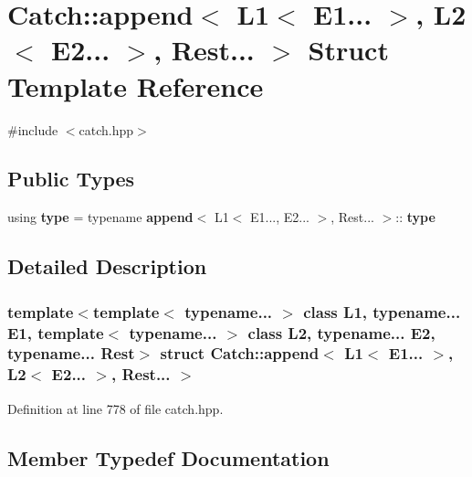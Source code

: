\section{Catch\+::append$<$ L1$<$ E1... $>$, L2$<$ E2... $>$, Rest... $>$ Struct Template Reference}
\label{struct_catch_1_1append_3_01_l1_3_01_e1_8_8_8_01_4_00_01_l2_3_01_e2_8_8_8_01_4_00_01_rest_8_8_8_01_4}


{\ttfamily \#include $<$catch.\+hpp$>$}

\subsection*{Public Types}
\begin{DoxyCompactItemize}
\item 
using \textbf{ type} = typename \textbf{ append}$<$ L1$<$ E1..., E2... $>$, Rest... $>$\+::\textbf{ type}
\end{DoxyCompactItemize}


\subsection{Detailed Description}
\subsubsection*{template$<$template$<$ typename... $>$ class L1, typename... E1, template$<$ typename... $>$ class L2, typename... E2, typename... Rest$>$\newline
struct Catch\+::append$<$ L1$<$ E1... $>$, L2$<$ E2... $>$, Rest... $>$}



Definition at line 778 of file catch.\+hpp.



\subsection{Member Typedef Documentation}
\mbox{\label{struct_catch_1_1append_3_01_l1_3_01_e1_8_8_8_01_4_00_01_l2_3_01_e2_8_8_8_01_4_00_01_rest_8_8_8_01_4_ab3448b6c1403a945f939d6ae6c5b39f2}} 
